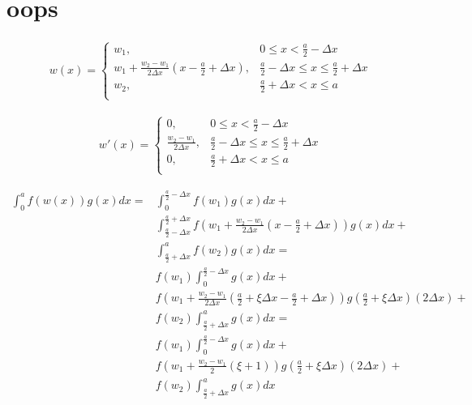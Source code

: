 \section{oops}

\begin{align}
w(x)  =\left\lbrace
\begin{array}{ll}
w_1, & 0 \le x < \displaystyle\frac{a}{2} - \Delta x \\
w_1 + \displaystyle\frac{w_2 - w_1}{2\Delta x}\left(x - \frac{a}{2} + \Delta x\right), & \displaystyle\frac{a}{2} - \Delta x \le x \le \displaystyle\frac{a}{2} + \Delta x\\
w_2, & \displaystyle\frac{a}{2} + \Delta x < x \le a \\
\end{array}
\right.
\end{align}

\begin{align}
w'(x)  =\left\lbrace
\begin{array}{ll}
0, & 0 \le x < \displaystyle\frac{a}{2} - \Delta x \\
\displaystyle\frac{w_2 - w_1}{2\Delta x}, & \displaystyle\frac{a}{2} - \Delta x \le x \le \displaystyle\frac{a}{2} + \Delta x\\
0, & \displaystyle\frac{a}{2} + \Delta x < x \le a \\
\end{array}
\right.
\end{align}

\begin{align}
\int_0^a f(w(x))g(x)dx = & \int_0^{\frac{a}{2} - \Delta x} f(w_1)g(x)dx
+ \nonumber \\
& \int_{\frac{a}{2} - \Delta x}^{\frac{a}{2} + \Delta x} f\left(w_1 + \frac{w_2 - w_1}{2\Delta x}\left(x - \frac{a}{2} + \Delta x\right)\right) g(x)dx
+ \nonumber \\
&
\int_{\frac{a}{2} + \Delta x}^a f(w_2)g(x)dx = \nonumber \\
& f(w_1) \int_0^{\frac{a}{2} - \Delta x} g(x)dx
+ \nonumber \\
& f\left(w_1 + \frac{w_2 - w_1}{2\Delta x}\left(\frac{a}{2} + \xi\Delta x - \frac{a}{2} + \Delta x\right)\right) g\left(\frac{a}{2} + \xi\Delta x\right) (2\Delta x)
+ \nonumber \\
&
f(w_2)\int_{\frac{a}{2} + \Delta x}^a g(x)dx = \nonumber \\
& f(w_1) \int_0^{\frac{a}{2} - \Delta x} g(x)dx
+ \nonumber \\
& f\left(w_1 + \frac{w_2 - w_1}{2}(\xi + 1)\right) g\left(\frac{a}{2} + \xi\Delta x\right) (2\Delta x)
+ \nonumber \\
&
f(w_2)\int_{\frac{a}{2} + \Delta x}^a g(x)dx
\end{align}

